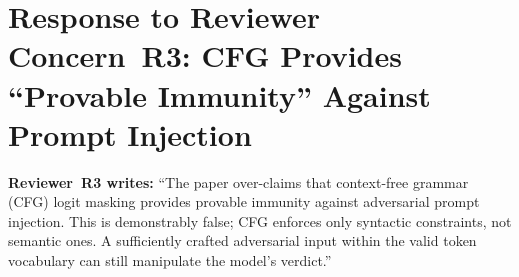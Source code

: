 \documentclass[10pt,letterpaper]{article}
\begin{document}
\section{Response to Reviewer Concern~R3: CFG Provides ``Provable Immunity''
Against Prompt Injection}

\begin{reviewerbox}
\textbf{Reviewer~R3 writes:} ``The paper over-claims that context-free grammar
(CFG) logit masking provides provable immunity against adversarial prompt
injection. This is demonstrably false; CFG enforces only syntactic
constraints, not semantic ones. A sufficiently crafted adversarial input
within the valid token vocabulary can still manipulate the model's verdict.''
\end{reviewerbox}
\end{document}
